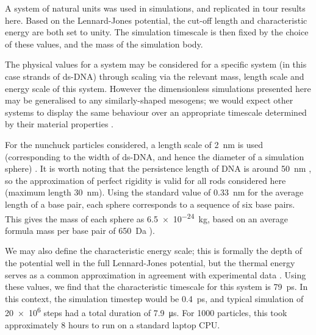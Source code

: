 \documentclass[11pt, a4paper]{article} %
\begin{document}
A system of natural units was used in simulations, and replicated in tour results here. Based on the Lennard-Jones potential, the cut-off length and characteristic energy are both set to unity. The simulation timescale is then fixed by the choice of these values, and the mass of the simulation body. 

The physical values for a system may be considered for a specific system (in this case strands of ds-DNA) through scaling via the relevant mass, length scale and energy scale of this system. However the dimensionless simulations presented here may be generalised to any similarly-shaped mesogens; we would expect other systems to display the same behaviour over an appropriate timescale determined by their material properties \cite{Rapaport2004}.

For the nunchuck particles considered, a length scale of \SI{2}{\nano\metre} is used (corresponding to the width of ds-DNA, and hence the diameter of a simulation sphere) \cite{Arnott1972}. It is worth noting that the persistence length of DNA is around \SI{50}{\nano\metre} \cite{Garcia2007}, so the approximation of perfect rigidity is valid for all rods considered here (maximum length \SI{30}{\nano\metre}). Using the standard value of \SI{0.33}{\nano\metre} \cite{Langridge1960} for the average length of a base pair, each sphere corresponds to a sequence of six base pairs. This gives the mass of each sphere as \SI{6.5e-24}{\kilogram}, based on an average formula mass per base pair of \SI{650}{\dalton} \cite{Duewer2018}). 

We may also define the characteristic energy scale; this is formally the depth of the potential well in the full Lennard-Jones potential, but the thermal energy serves as a common approximation \cite{Pan2010} in agreement with experimental data \cite{Wang2002}. Using these values, we find that the characteristic timescale for this system is \SI{79}{\pico\second}. In this context, the simulation timestep would be \SI{0.4}{\pico\second}, and typical simulation of \num{20e6} steps had a total duration of \SI{7.9}{\micro\second}. For \num{1000} particles, this took approximately $8$ hours to run on a standard laptop CPU. %
\end{document}
